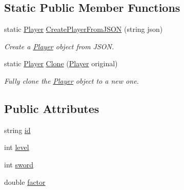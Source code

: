 \subsection*{Static Public Member Functions}
\begin{DoxyCompactItemize}
\item 
static \mbox{\hyperlink{class_player}{Player}} \mbox{\hyperlink{class_player_a9278b5c20dc0e3b2cab022cccacac63c}{Create\+Player\+From\+J\+S\+ON}} (string json)
\begin{DoxyCompactList}\small\item\em Create a \mbox{\hyperlink{class_player}{Player}} object from J\+S\+ON. \end{DoxyCompactList}\item 
static \mbox{\hyperlink{class_player}{Player}} \mbox{\hyperlink{class_player_adf965ae02f9b21712dcd93b8a2f955f4}{Clone}} (\mbox{\hyperlink{class_player}{Player}} original)
\begin{DoxyCompactList}\small\item\em Fully clone the \mbox{\hyperlink{class_player}{Player}} object to a new one. \end{DoxyCompactList}\end{DoxyCompactItemize}
\subsection*{Public Attributes}
\begin{DoxyCompactItemize}
\item 
string \mbox{\hyperlink{class_player_a4133cf7ecb22b0ae16ee457c46eacc08}{id}}
\item 
int \mbox{\hyperlink{class_player_a400a72423db730ee29977227c4860cfd}{level}}
\item 
int \mbox{\hyperlink{class_player_aa6c1d9c5753ea9a365f28eac36238d1f}{sword}}
\item 
double \mbox{\hyperlink{class_player_a1d8f77afde9a68f34917561d915a5656}{factor}}
\end{DoxyCompactItemize}
